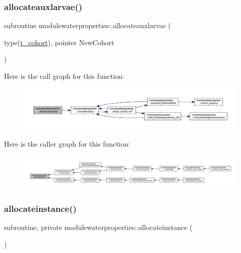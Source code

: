 \subsubsection{\texorpdfstring{allocateauxlarvae()}{allocateauxlarvae()}}
{\footnotesize\ttfamily subroutine modulewaterproperties\+::allocateauxlarvae (\begin{DoxyParamCaption}\item[{type(\mbox{\hyperlink{structmodulewaterproperties_1_1t__cohort}{t\+\_\+cohort}}), pointer}]{New\+Cohort }\end{DoxyParamCaption})\hspace{0.3cm}{\ttfamily [private]}}

Here is the call graph for this function\+:\nopagebreak
\begin{figure}[H]
\begin{center}
\leavevmode
\includegraphics[width=350pt]{namespacemodulewaterproperties_a7cc00cb7efcee6190d254a8eb846064c_cgraph}
\end{center}
\end{figure}
Here is the caller graph for this function\+:\nopagebreak
\begin{figure}[H]
\begin{center}
\leavevmode
\includegraphics[width=350pt]{namespacemodulewaterproperties_a7cc00cb7efcee6190d254a8eb846064c_icgraph}
\end{center}
\end{figure}
\mbox{\label{namespacemodulewaterproperties_ade36efb7389c89e5e20b885a9157f285}} 
\subsubsection{\texorpdfstring{allocateinstance()}{allocateinstance()}}
{\footnotesize\ttfamily subroutine, private modulewaterproperties\+::allocateinstance (\begin{DoxyParamCaption}{ }\end{DoxyParamCaption})\hspace{0.3cm}{\ttfamily [private]}}

